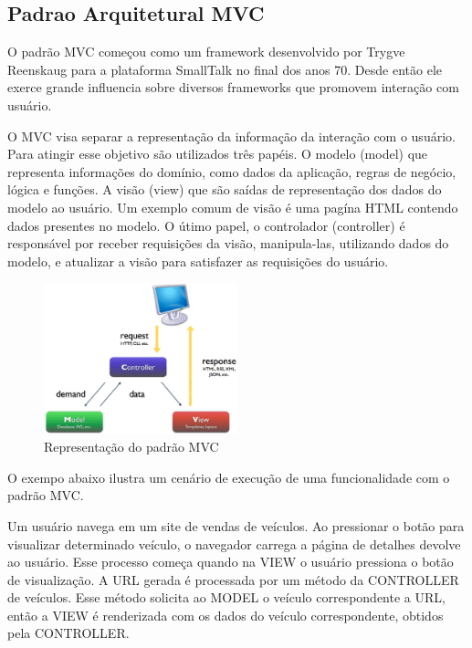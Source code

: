 
\subsection{Padrao Arquitetural MVC}

O padrão MVC começou como um framework desenvolvido por Trygve Reenskaug para a plataforma SmallTalk no final dos anos 70. Desde então ele exerce grande influencia sobre diversos frameworks que promovem interação com usuário.

O MVC visa separar a representação da informação da interação com o usuário. Para atingir esse objetivo são utilizados três papéis. O modelo (model) que representa informações do domínio, como dados da aplicação, regras de negócio, lógica e funções. A visão (view) que são saídas de representação dos dados do modelo ao usuário. Um exemplo comum de visão é uma pagína HTML contendo dados presentes no modelo. O útimo papel, o controlador (controller) é responsável por receber requisições da visão, manipula-las, utilizando dados do modelo, e atualizar a visão para satisfazer as requisições do usuário.

\graphicspath{{figuras/}}
\begin{figure}[H]
\centering
\includegraphics[width=0.5\textwidth]{mvc}
\caption{Representação do padrão MVC}
\label{mvc}
\end{figure}

O exempo abaixo ilustra um cenário de execução de uma funcionalidade com o padrão MVC.

\begin{mdframed}[frametitle={Exemplo},roundcorner=5pt, backgroundcolor=lightgray]
Um usuário navega em um site de vendas de veículos. Ao pressionar o botão para visualizar determinado veículo, o navegador carrega a página de detalhes devolve ao usuário. Esse processo começa quando na VIEW o usuário pressiona o botão de visualização. A URL gerada é processada por um método da CONTROLLER de veículos. Esse método solicita ao MODEL o veículo correspondente a URL, então a VIEW é renderizada com os dados do veículo correspondente, obtidos pela CONTROLLER.
\end{mdframed}

